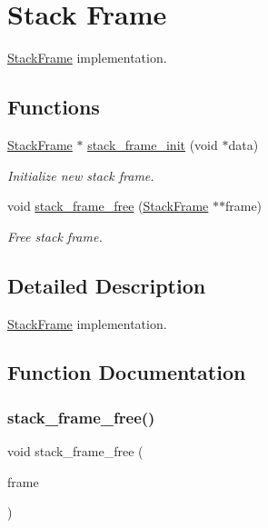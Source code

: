 \hypertarget{group__StackFrame}{}\section{Stack Frame}
\label{group__StackFrame}


\hyperlink{structStackFrame}{Stack\+Frame} implementation.  


\subsection*{Functions}
\begin{DoxyCompactItemize}
\item 
\hyperlink{structStackFrame}{Stack\+Frame} $\ast$ \hyperlink{group__StackFrame_ga2ecf08ec1545d0db09d8558460770c53}{stack\+\_\+frame\+\_\+init} (void $\ast$data)
\begin{DoxyCompactList}\small\item\em Initialize new stack frame. \end{DoxyCompactList}\item 
void \hyperlink{group__StackFrame_gacf9978dee50e18700dbd17c5346ff0ce}{stack\+\_\+frame\+\_\+free} (\hyperlink{structStackFrame}{Stack\+Frame} $\ast$$\ast$frame)
\begin{DoxyCompactList}\small\item\em Free stack frame. \end{DoxyCompactList}\end{DoxyCompactItemize}


\subsection{Detailed Description}
\hyperlink{structStackFrame}{Stack\+Frame} implementation. 



\subsection{Function Documentation}
\mbox{\label{group__StackFrame_gacf9978dee50e18700dbd17c5346ff0ce}} 
\subsubsection{\texorpdfstring{stack\+\_\+frame\+\_\+free()}{stack\_frame\_free()}}
{\footnotesize\ttfamily void stack\+\_\+frame\+\_\+free (\begin{DoxyParamCaption}\item[{\hyperlink{structStackFrame}{Stack\+Frame} $\ast$$\ast$}]{frame }\end{DoxyParamCaption})}



